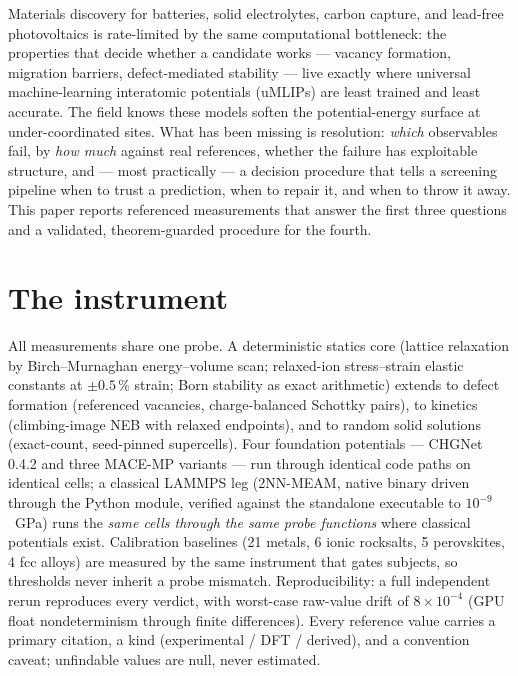 \documentclass[11pt]{article}
\theoremstyle{definition}
\theoremstyle{remark}
\begin{document}
\bigskip
\noindent Materials discovery for batteries, solid electrolytes, carbon capture, and lead-free photovoltaics is rate-limited by the same computational bottleneck: the properties that decide whether a candidate works --- vacancy formation, migration barriers, defect-mediated stability --- live exactly where universal machine-learning interatomic potentials (uMLIPs) are least trained and least accurate. The field knows these models soften the potential-energy surface at under-coordinated sites. What has been missing is resolution: \emph{which} observables fail, by \emph{how much} against real references, whether the failure has exploitable structure, and --- most practically --- a decision procedure that tells a screening pipeline when to trust a prediction, when to repair it, and when to throw it away. This paper reports referenced measurements that answer the first three questions and a validated, theorem-guarded procedure for the fourth.

\section*{The instrument}

All measurements share one probe. A deterministic statics core (lattice relaxation by Birch--Murnaghan energy--volume scan; relaxed-ion stress--strain elastic constants at $\pm 0.5\,\%$ strain; Born stability as exact arithmetic) extends to defect formation (referenced vacancies, charge-balanced Schottky pairs), to kinetics (climbing-image NEB with relaxed endpoints), and to random solid solutions (exact-count, seed-pinned supercells). Four foundation potentials --- CHGNet 0.4.2 and three MACE-MP variants --- run through identical code paths on identical cells; a classical LAMMPS leg (2NN-MEAM, native binary driven through the Python module, verified against the standalone executable to $10^{-9}$~GPa) runs the \emph{same cells through the same probe functions} where classical potentials exist. Calibration baselines (21 metals, 6 ionic rocksalts, 5 perovskites, 4 fcc alloys) are measured by the same instrument that gates subjects, so thresholds never inherit a probe mismatch. Reproducibility: a full independent rerun reproduces every verdict, with worst-case raw-value drift of $8\times 10^{-4}$ (GPU float nondeterminism through finite differences). Every reference value carries a primary citation, a kind (experimental / DFT / derived), and a convention caveat; unfindable values are null, never estimated.
\end{document}
